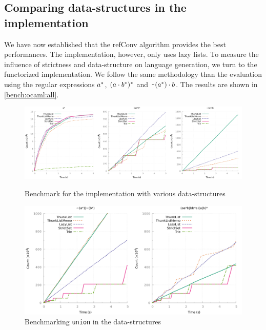 \subsection{Comparing data-structures in the \ocaml implementation}
\label{sec:bench:ocaml}

We have now established that the refConv algorithm provides the best performances.
The \haskell implementation, however, only uses lazy lists. To measure
the influence of strictness and data-structure on language generation,
we turn to the functorized \ocaml implementation.
We follow the same methodology than the \haskell evaluation using
the regular expressions
$a^*$, $(a \cdot{b^*})^*$ and
$\texttt{\textasciitilde}{(a^*)} \cdot{b}$.
The results are shown in \cref{bench:ocaml:all}.

\begin{figure}[b]
  \centering
  \includegraphics[height=0.33\linewidth]{measure/ocaml_all.png}
  \caption{Benchmark for the \ocaml implementation with various data-structures}
  \label{bench:ocaml:all}
  \includegraphics[height=0.33\linewidth]{measure/ocaml_union.png}
  \caption{Benchmarking \texttt{union} in the \ocaml data-structures}
  \label{bench:ocaml:union}
\end{figure}

